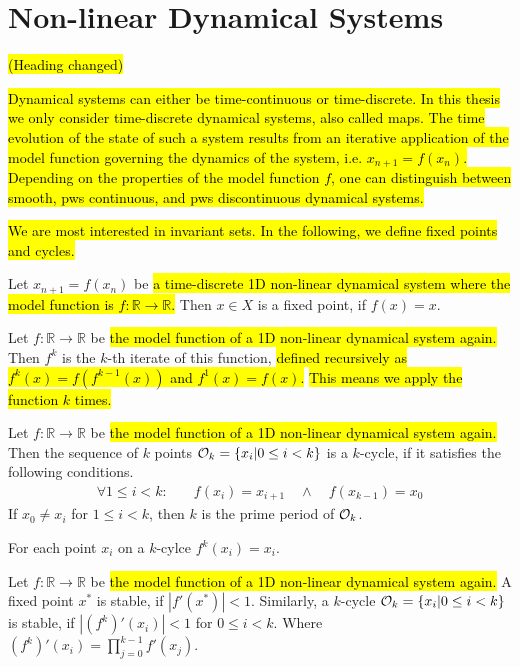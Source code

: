 \section{Non-linear Dynamical Systems}

\hl{(Heading changed)}

\hl{
	Dynamical systems can either be time-continuous or time-discrete.
	In this thesis we only consider time-discrete dynamical systems, also called maps.
	The time evolution of the state of such a system results from an iterative application of the model function governing the dynamics of the system, i.e. $x_{n+1} = f(x_n)$.
	Depending on the properties of the model function $f$, one can distinguish between smooth, \gls{pws} continuous, and \gls{pws} discontinuous dynamical systems.
}

\hl{
	We are most interested in invariant sets.
	In the following, we define fixed points and cycles.
}

\begin{definition}
	Let $x_{n+1} = f(x_n)$ be \hl{a time-discrete 1D non-linear dynamical system where the model function is $f: \mathbb{R} \to \mathbb{R}$.}
	Then $x \in X$ is a fixed point, if $f(x) = x$.
\end{definition}

\begin{definition}
	Let $f: \mathbb{R} \to \mathbb{R}$ be \hl{the model function of a 1D non-linear dynamical system again.}
	Then $f^k$ is the $k$-th iterate of this function, \hl{defined recursively as $f^k(x) = f\left(f^{k-1}(x)\right)$ and $f^1(x) = f(x)$.}
	\hl{This means we apply the function $k$ times.}
\end{definition}

\begin{definition}[Cycle]
	Let $f: \mathbb{R} \to \mathbb{R}$ be \hl{the model function of a 1D non-linear dynamical system again.}
	Then the sequence of $k$ points $\mathcal{O}_k = \{x_i | 0 \leq i < k\}$ is a $k$-cycle, if it satisfies the following conditions.
	\begin{align*}
		\forall 1 \leq i < k: \quad & f(x_i) = x_{i+1} \quad \land \quad f(x_{k-1}) = x_0
	\end{align*}
	If $x_0 \neq x_i$ for $1 \leq i < k$, then $k$ is the prime period of $\mathcal{O}_k$.
\end{definition}

For each point $x_i$ on a $k$-cylce $f^k(x_i) = x_i$.

\begin{definition}[Stability]
	Let $f: \mathbb{R} \to \mathbb{R}$ be \hl{the model function of a 1D non-linear dynamical system again.}
	A fixed point $x^*$ is stable, if $|f'(x^*)| < 1$.
	Similarly, a $k$-cycle $\mathcal{O}_k = \{x_i | 0 \leq i < k\}$ is stable, if $|(f^k)'(x_i)| < 1$ for $0 \leq i < k$.
	Where $(f^k)'(x_i) = \prod_{j=0}^{k-1} f'(x_j)$.
\end{definition}

